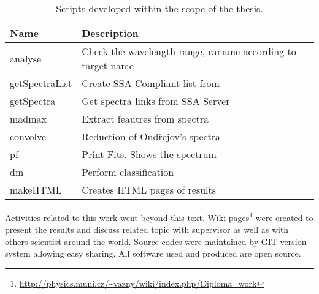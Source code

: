 \begin{table}[ht]
  \centering
  \small
     \begin{tabular}[ht]{l l}
     \toprule
     Name & Description \\
     \midrule
     analyse & Check the wavelength range, raname according to
     target name\\
     getSpectraList & Create SSA Compliant list from\\
     getSpectra & Get spectra links from SSA Server\\
     madmax & Extract feautres from spectra \\
     convolve &  Reduction of Ondřejov's spectra\\
     pf & Print Fits. Shows the spectrum \\
     dm &  Perform classification\\
     makeHTML & Creates HTML pages of results \\ 
     \bottomrule
   \end{tabular}
  \caption{Scripts developed within the scope of the thesis.}
  \label{tab:scripts}
\end{table}


Activities related to this work went beyond this text. Wiki
pages\footnote{\url{http://physics.muni.cz/~vazny/wiki/index.php/Diploma_work}}
were created to present the results and discuss related topic with
supervisor as well as with others scientist around the world. Source
codes were maintained by GIT version system allowing easy sharing. All
software used and produced are open source.







